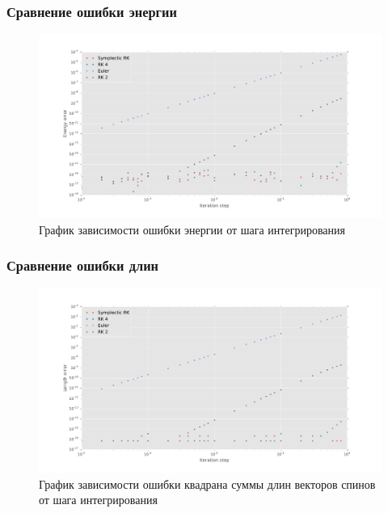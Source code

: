 \documentclass[t]{beamer}
\begin{document}
\begin{frame}
    \frametitle{Сравнение ошибки энергии}
    \begin{figure}[h]
        \includegraphics[width=\textwidth]{errorComparsionEnergy}
        \caption{График зависимости ошибки энергии от шага интегрирования}
    \end{figure}
\end{frame}

\begin{frame}
    \frametitle{Сравнение ошибки длин}
    \begin{figure}[h]
        \includegraphics[width=\textwidth]{errorComparsionLength}
        \caption{График зависимости ошибки квадрана суммы длин векторов спинов
        от шага интегрирования}
    \end{figure}
\end{frame}
\end{document}
